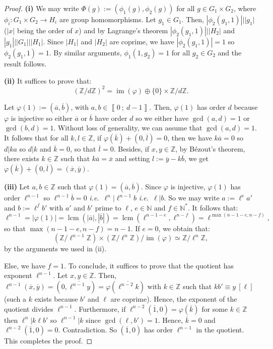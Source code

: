 \documentclass[a4paper,10pt]{report}
\theoremstyle{definition}
\theoremstyle{plain}
\theoremstyle{definition}
\newcommand{\ie}{\emph{i.e.}\ }
\newcommand{\N}{\mathbb{N}}
\newcommand{\Z}{\mathbb{Z}}
\DeclareMathOperator{\im}{im}
\renewcommand{\i}[2]{\left\llbracket #1~;~#2\right\rrbracket}
\renewcommand{\(}{\left(}
\renewcommand{\)}{\right)}
\DeclareMathOperator{\lcm}{lcm}
\begin{document}
\begin{proof}
\textbf{(i)} We may write $\Phi(g):=(\phi_1(g),\phi_2(g))$ for all $g\in G_1\times G_2$, where $\phi_i:G_1\times G_2\longrightarrow H_i$ are group homomorphisms.  Let $g_1\in G_1$. Then, $|\phi_2(g_1,1)|||g_1|$ ($|x|$ being the order of $x$) and by Lagrange's theorem $|\phi_2(g_1,1)|||H_2|$ and $|g_1|||G_1|||H_1|$. Since $|H_1|$ and $|H_2|$ are coprime, we have $|\phi_2(g_1,1)|=1$ so $\phi_2(g_1,1)=1$. By similar arguments, $\phi_1(1,g_2)=1$ for all $g_2\in G_2$ and the result follows.

\textbf{(ii)} It suffices to prove that:
\[ (\Z/d\Z)^2=\im(\varphi)\oplus\{0\}\times\Z/d\Z.\]

Let $\varphi(1):=(\overline{a},\overline{b})$, with $a,b\in\i{0}{d-1}$. Then,  $\varphi(1)$ has order $d$ because $\varphi$ is injective so either $\overline{a}$ or $\overline{b}$ have order $d$ so we either have $\gcd(a,d)=1$ or $\gcd(b,d)=1$. Without loss of generality, we can assume that $\gcd(a,d)=1$.  It follows that for all $k,l\in\Z$, if $\varphi(\overline{k})+(0,\overline{l})=0$, then we have $k\overline{a}=0$ so $d|ka$ so $d|k$ and $\overline{k}=0$, so that $\overline{l}=0$. Besides, if $x,y\in\Z$, by B\'{e}zout's theorem, there exists $k\in\Z$ such that $k\overline{a}=\overline{x}$ and setting $l:=\overline{y}-k\overline{b}$, we get $\varphi(\overline{k})+(0,\overline{l})=(\overline{x},\overline{y})$. 

\textbf{(iii)} Let $a,b\in\Z$ such that $\varphi(1)=(\overline{a},\overline{b})$.  Since $\varphi$ is injective, $\varphi(1)$ has order $\ell^{n-1}$ so $\ell^{n-1}\overline{b}=0$ \ie $\ell^n|\ell^{n-1}b$ \ie $\ell|b$. So we may write $a:=\ell^e a'$ and $b:=\ell^f b'$ with $a'$ and $b'$ prime to $\ell$, $e\in\N$ and $f\in\N^*$.  It follows that:
\[\ell^{n-1}=|\varphi(1)|=\lcm(|\overline{a}|,|\overline{b}|)=\lcm(\ell^{n-1-e},\ell^{n-f})=\ell^{\max(n-1-e,n-f)},\]
so that $\max(n-1-e,n-f)=n-1$. If $e=0$, we obtain that:
\[(\Z/\ell^{n-1}\Z)\times(\Z/\ell^{n}\Z)/\im(\varphi)\simeq \Z/\ell^{n}\Z,\]
by the arguments we used in (ii). 

Else, we have $f=1$. To conclude, it suffices to prove that the quotient has exponent $\ell^{n-1}$. Let $x,y\in\Z$. Then, $\ell^{n-1}(\overline{x},\overline{y})=(0,\overline{\ell^{n-1}y})=\varphi(\overline{\ell^{n-2}k})$ with $k\in\Z$ such that $kb'\equiv y \ [\ell]$ (such a $k$ exists because $b'$ and $\ell$ are coprime).  Hence, the exponent of the quotient divides $\ell^{n-1}$.  Furthermore, if $\ell^{n-2}(\overline{1},0)=\varphi(\overline{k})$ for some $k\in\Z$ then $\ell^n|k\ell b'$ so $\ell^{n-1}|k$ since $\gcd(\ell,b')=1$. Hence, $\overline{k}=0$ and $\ell^{n-2}(\overline{1},0)=0$. Contradiction. So $(\overline{1},0)$ has order $\ell^{n-1}$ in the quotient. This completes the proof.

\end{proof}
\end{document}
